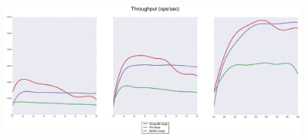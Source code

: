 \documentclass[usenames,dvipsnames, 18pt, compress, aspectratio=169]{beamer}
\begin{document}
\begin{frame}
    \frametitle{}
    \begin{center}
    \begin{figure}
        \includegraphics[height=8cm,width=1.1\textwidth,center]{benchmarks/scalability_select_throughput.png}
    \end{figure}
    \end{center}
\end{frame}



\end{document}
